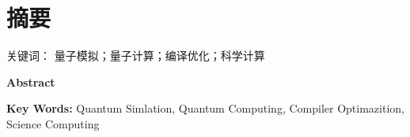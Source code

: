 \fancyhead{}
\fancyfoot[CO,CE]{\thepage}
\setcounter{page}{1}

\section*{摘\hspace*{1em}要}

\blindtext

\vspace*{1em}

{{\hei 关键词：}
        {\songti 量子模拟；量子计算；编译优化；科学计算}}

\clearpage

\begin{center}
    \normalfont{}\bfseries
    Abstract
\end{center}

\blindtext

\vspace*{1em}

{{\bfseries Key Words: }
        { Quantum Simlation, Quantum Computing,
            Compiler Optimazition, Science Computing}}

\clearpage